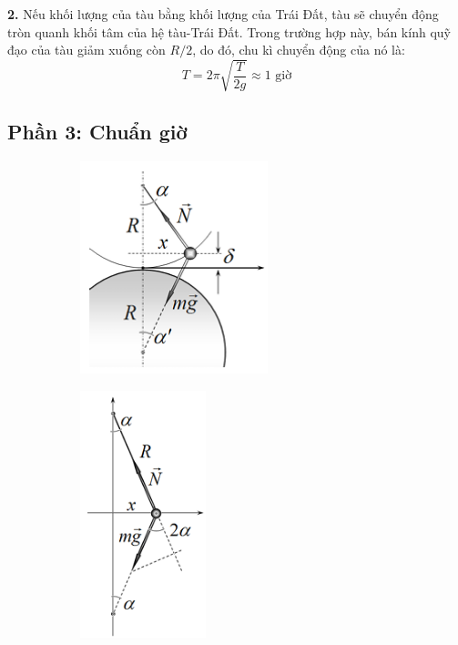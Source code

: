 \noindent\textbf{2.} Nếu khối lượng của tàu bằng khối lượng của Trái Đất, tàu sẽ chuyển động tròn quanh khối tâm của hệ tàu-Trái Đất. Trong trường hợp này, bán kính quỹ đạo của tàu giảm xuống còn $R/2$, do đó, chu kì chuyển động của nó là:
\begin{equation*}
  T=2\pi\sqrt{\frac{T}{2g}}\approx 1 \text{ giờ}
\end{equation*}

\subsection*{Phần 3: Chuẩn giờ}
\begin{figure}[h]
  \centering
  \begin{subfigure}[b]{0.49\textwidth}
    \centering
    \includegraphics[width=0.6\textwidth]{Figures/P1/Fig 1.2S.png}
  \end{subfigure}
  \hfill
  \begin{subfigure}[b]{0.49\textwidth}
    \centering
    \includegraphics[width=0.4\textwidth]{Figures/P1/Fig 1.1S.png}
  \end{subfigure}
\end{figure}

